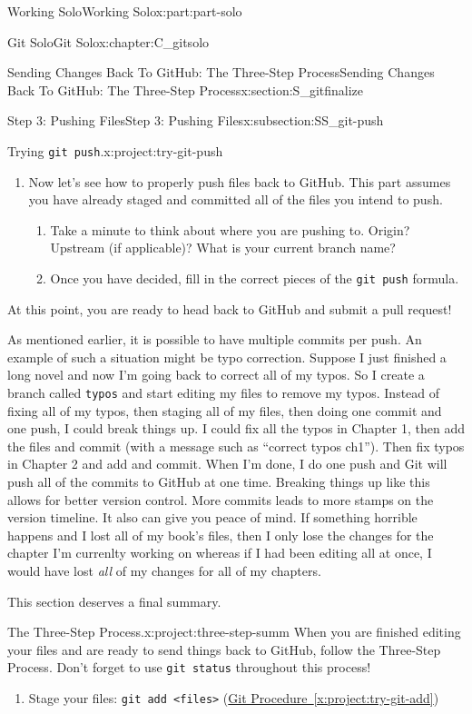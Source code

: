 \documentclass[oneside,10pt,]{book}
\newcommand{\xreffont}{\relax}
\newcommand{\mono}[1]{\texttt{#1}}
\begin{document}
\begin{partptx}{Working Solo}{}{Working Solo}{}{}{x:part:part-solo}
\begin{chapterptx}{Git Solo}{}{Git Solo}{}{}{x:chapter:C_gitsolo}
\begin{sectionptx}{Sending Changes Back To GitHub: The Three-Step Process}{}{Sending Changes Back To GitHub: The Three-Step Process}{}{}{x:section:S_gitfinalize}
\begin{subsectionptx}{Step 3: Pushing Files}{}{Step 3: Pushing Files}{}{}{x:subsection:SS_git-push}
\begin{project}{Trying \mono{git push}.}{x:project:try-git-push}
\begin{enumerate}[font=\bfseries,label=(\alph*),ref=\alph*]
\begin{enumerate}[font=\bfseries,label=(\roman*),ref=\theenumi.\roman*]
\end{enumerate}
\item{}Now let's see how to properly push files back to GitHub. This part assumes you have already staged and committed all of the files you intend to push.%
\begin{enumerate}[font=\bfseries,label=(\roman*),ref=\theenumi.\roman*]
\item{}Take a minute to think about where you are pushing to. Origin? Upstream (if applicable)? What is your current branch name?%
\item{}Once you have decided, fill in the correct pieces of the \mono{git push} formula.%
\end{enumerate}
\end{enumerate}
At this point, you are ready to head back to GitHub and submit a pull request!%
\end{project}%
As mentioned earlier, it is possible to have multiple commits per push. An example of such a situation might be typo correction. Suppose I just finished a long novel and now I'm going back to correct all of my typos. So I create a branch called \mono{typos} and start editing my files to remove my typos. Instead of fixing all of my typos, then staging all of my files, then doing one commit and one push, I could break things up. I could fix all the typos in Chapter 1, then add the files and commit (with a message such as ``correct typos ch1''). Then fix typos in Chapter 2 and add and commit. When I'm done, I do one push and Git will push all of the commits to GitHub at one time. Breaking things up like this allows for better version control. More commits leads to more stamps on the version timeline. It also can give you peace of mind. If something horrible happens and I lost all of my book's files, then I only lose the changes for the chapter I'm currenlty working on whereas if I had been editing all at once, I would have lost \emph{all} of my changes for all of my chapters.%
\end{subsectionptx}
This section deserves a final summary. \begin{project}{The Three-Step Process.}{x:project:three-step-summ}%
When you are finished editing your files and are ready to send things back to GitHub, follow the Three-Step Process. Don't forget to use \mono{git status} throughout this process!%
\begin{enumerate}
\item{}Stage your files: \mono{git add <files>} (\hyperref[x:project:try-git-add]{Git Procedure~{\xreffont\ref{x:project:try-git-add}}})%

\end{enumerate}
\end{project}
\end{sectionptx}
\end{chapterptx}
\end{partptx}
\end{document}
